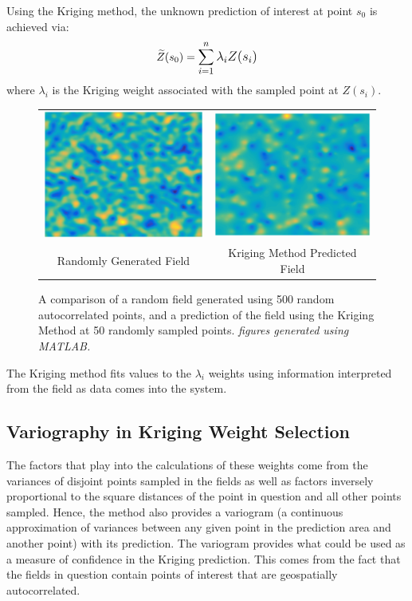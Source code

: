 \documentclass[11pt]{ucthesis}
\begin{document}
Using the Kriging method, the unknown prediction of interest at point $s_{0}$ is achieved via:
\begin{equation}
\widetilde{Z}(s_{0})=\mathlarger{\sum\limits_{i=1}^{n}\lambda_{i}Z(s_{i})}
\end{equation}
where $\lambda_{i}$ is the Kriging weight associated with the sampled point at $Z(s_{i})$.
\begin{center}
	\begin{figure}[h]
		\begin{tabular}{cc}
			\centering
			\includegraphics[width=0.49\linewidth]{random_field.eps} &
			\includegraphics[width=0.49\linewidth]{kriging_prediction.eps} \\
			Randomly Generated Field & Kriging Method Predicted Field\\
		\end{tabular}
		\caption{A comparison of a random field generated using 500 random autocorrelated points, and a prediction of the field using the Kriging Method at 50 randomly sampled points. \textit{figures generated using MATLAB.}}
	\end{figure}
\end{center}

The Kriging method fits values to the $\lambda_{i}$ weights using information interpreted from the field as data comes into the system. 

\subsection{Variography in Kriging Weight Selection}
The factors that play into the calculations of these weights come from the variances of disjoint points sampled in the fields as well as factors inversely proportional to the square distances of the point in question and all other points sampled. Hence, the method also provides a variogram (a continuous approximation of variances between any given point in the prediction area and another point) with its prediction. The variogram provides what could be used as a measure of confidence in the Kriging prediction. This comes from the fact that the fields in question contain points of interest that are geospatially autocorrelated. 
\end{document}
